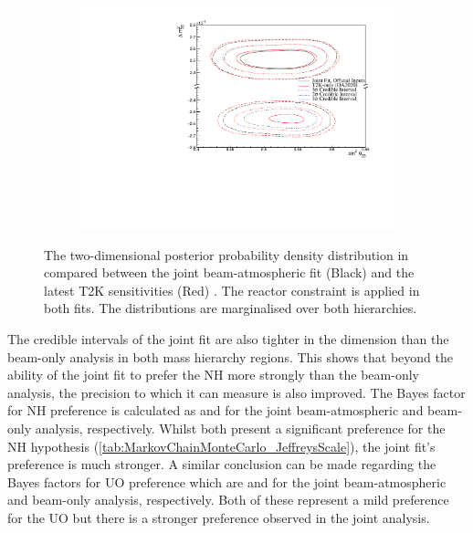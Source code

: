 \begin{figure}[h]
  \begin{subfigure}[t]{0.98\textwidth}
    \includegraphics[width=\textwidth, trim={0mm 0mm 0mm 0mm}, clip,page=1]{Figures/OA/JointFit_OA2020_wRC_Comp/ContourComparison_2D_th23_dm32_BH_1_wRC_UnSmeared_CredibleInterval.pdf}
  \end{subfigure}
  \caption{The two-dimensional posterior probability density distribution in  compared between the joint beam-atmospheric fit (Black) and the latest T2K sensitivities (Red) \cite{t2k_tn_399}. The reactor constraint is applied in both fits. The distributions are marginalised over both hierarchies.}
  \label{fig:OscillationAnalysis_JointFit_OA2020_wRC_TH23DM32}
\end{figure}

The credible intervals of the joint fit are also tighter in the  dimension than the beam-only analysis in both mass hierarchy regions. This shows that beyond the ability of the joint fit to prefer the NH more strongly than the beam-only analysis, the precision to which it can measure  is also improved. The Bayes factor for NH preference is calculated as  and  for the joint beam-atmospheric and beam-only analysis, respectively. Whilst both present a significant preference for the NH hypothesis (\autoref{tab:MarkovChainMonteCarlo_JeffreysScale}), the joint fit's preference is much stronger. A similar conclusion can be made regarding the Bayes factors for UO preference which are  and  for the joint beam-atmospheric and beam-only analysis, respectively. Both of these represent a mild preference for the UO but there is a stronger preference observed in the joint analysis.

